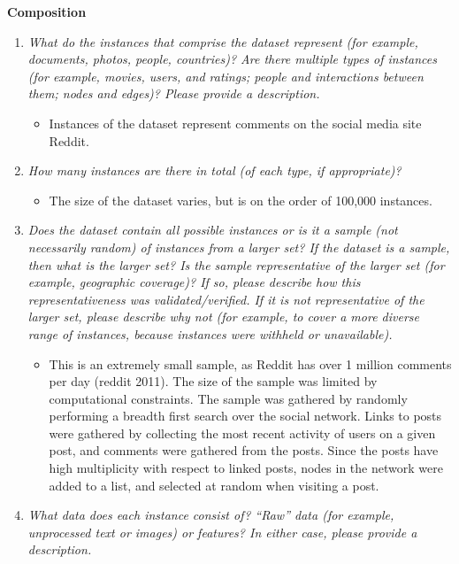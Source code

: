 \documentclass[
]{article}
\providecommand{\tightlist}{%
  \setlength{\itemsep}{0pt}\setlength{\parskip}{0pt}}
\begin{document}
\textbf{Composition}

\begin{enumerate}
\def\labelenumi{\arabic{enumi}.}
\tightlist
\item
  \emph{What do the instances that comprise the dataset represent (for example, documents, photos, people, countries)? Are there multiple types of instances (for example, movies, users, and ratings; people and interactions between them; nodes and edges)? Please provide a description.}

  \begin{itemize}
  \tightlist
  \item
    Instances of the dataset represent comments on the social media site Reddit.
  \end{itemize}
\item
  \emph{How many instances are there in total (of each type, if appropriate)?}

  \begin{itemize}
  \tightlist
  \item
    The size of the dataset varies, but is on the order of 100,000 instances.
  \end{itemize}
\item
  \emph{Does the dataset contain all possible instances or is it a sample (not necessarily random) of instances from a larger set? If the dataset is a sample, then what is the larger set? Is the sample representative of the larger set (for example, geographic coverage)? If so, please describe how this representativeness was validated/verified. If it is not representative of the larger set, please describe why not (for example, to cover a more diverse range of instances, because instances were withheld or unavailable).}

  \begin{itemize}
  \tightlist
  \item
    This is an extremely small sample, as Reddit has over 1 million comments per day (reddit 2011). The size of the sample was limited by computational constraints. The sample was gathered by randomly performing a breadth first search over the social network. Links to posts were gathered by collecting the most recent activity of users on a given post, and comments were gathered from the posts. Since the posts have high multiplicity with respect to linked posts, nodes in the network were added to a list, and selected at random when visiting a post.
  \end{itemize}
\item
  \emph{What data does each instance consist of? ``Raw'' data (for example, unprocessed text or images) or features? In either case, please provide a description.}


\end{enumerate}
\end{document}
